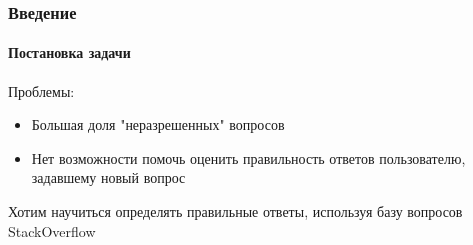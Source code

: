 \documentclass[10pt]{beamer}
\begin{document}
\begin{frame}
\frametitle{Введение}
\framesubtitle{Постановка задачи}

Проблемы:
\begin{itemize}
	\item Большая доля "неразрешенных" вопросов
	\item Нет возможности помочь оценить правильность ответов пользователю, задавшему новый вопрос
\end{itemize}

\vskip0.5cm

Хотим научиться определять правильные ответы, используя базу вопросов StackOverflow

\end{frame}

\end{document}
